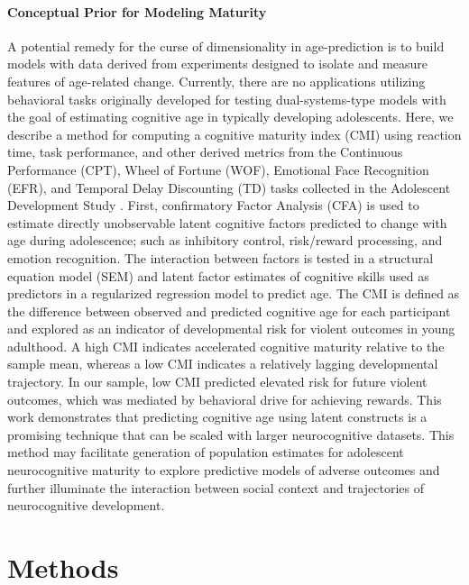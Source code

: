 \documentclass[utf8]{stylesheet}
\begin{document}
\paragraph{Conceptual Prior for Modeling Maturity} A potential remedy for the curse of dimensionality in age-prediction is to build models with data derived from experiments designed to isolate and measure features of age-related change. Currently, there are no applications utilizing behavioral tasks originally developed for testing dual-systems-type models with the goal of estimating cognitive age in typically developing adolescents. Here, we describe a method for computing a cognitive maturity index (CMI) using reaction time, task performance, and other derived metrics from the Continuous Performance (CPT), Wheel of Fortune (WOF), Emotional Face Recognition (EFR), and Temporal Delay Discounting (TD) tasks collected in the Adolescent Development Study \citep{Fishbein2016}. First, confirmatory Factor Analysis (CFA) is used to estimate directly unobservable latent cognitive factors predicted to change with age during adolescence; such as inhibitory control, risk/reward processing, and emotion recognition. The interaction between factors is tested in a structural equation model (SEM) and latent factor estimates of cognitive skills used as predictors in a regularized regression model to predict age. The CMI is defined as the difference between observed and predicted cognitive age for each participant and explored as an indicator of developmental risk for violent outcomes in young adulthood. A high CMI indicates accelerated cognitive maturity relative to the sample mean, whereas a low CMI indicates a relatively lagging developmental trajectory. In our sample, low CMI predicted elevated risk for future violent outcomes, which was mediated by behavioral drive for achieving rewards. This work demonstrates that predicting cognitive age using latent constructs is a promising technique that can be scaled with larger neurocognitive datasets. This method may facilitate generation of population estimates for adolescent neurocognitive maturity to explore predictive models of adverse outcomes and further illuminate the interaction between social context and trajectories of neurocognitive development. 
\vspace{10pt}

\section{Methods}
\end{document}
